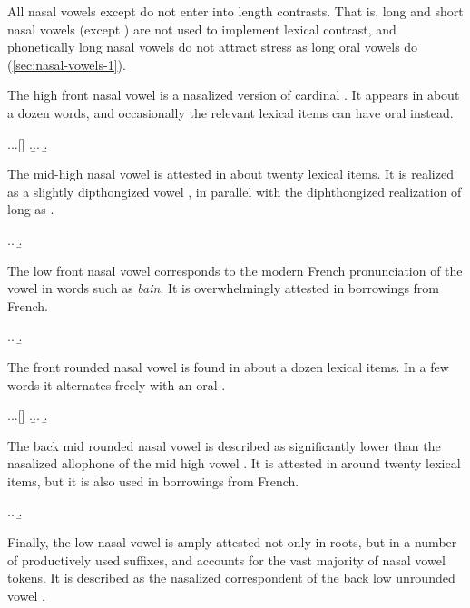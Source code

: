 All nasal vowels except  do not enter into length contrasts. That is, long and short nasal vowels (except ) are not used to implement lexical contrast, and phonetically long nasal vowels do not attract stress as long oral vowels do (\cref{sec:nasal-vowels-1}).

The high front nasal vowel \ipa{[ĩ]} is a nasalized version of cardinal \ipa{[i]}. It appears in about a dozen words, and occasionally the relevant lexical items can have oral \ipa{[i]} instead.

\ex.\a.\a.[]
\z.\b.\a.
\b.\mbi{[ˈhiʒal]}

The mid-high nasal vowel  is attested in about twenty lexical items. It is realized as a slightly dipthongized vowel \ipa{[ẽ\textsuperscript{ĩ}]}, in parallel with the diphthongized realization of long  as \ipa{[e\textsuperscript{i}]}.

\ex.\a.
\b.

The low front nasal vowel \ipa{[æ̃]} corresponds to the modern French pronunciation of the vowel in words such as \emph{bain}. It is overwhelmingly attested in borrowings from French.

\ex.\a.
\b.


The front rounded nasal vowel \ipa{[ø̃]} is found in about a dozen lexical items. In a few words it alternates freely with an oral \ipa{[ø]}.

\ex.\a.\a.[]
\z.\b.\a.
\b.\mbi{[ˈmø̃ːz̥]}

The back mid rounded nasal vowel  is described as significantly lower than the nasalized allophone of the mid high vowel \ipa{[o]}. It is attested in around twenty lexical items, but it is also used in borrowings from French.

\ex.\a.
\b.

Finally, the low nasal vowel  is amply attested not only in roots, but in a number of productively used suffixes, and accounts for the vast majority of nasal vowel tokens. It is described as the nasalized correspondent of the back low unrounded vowel \ipa{[ɑ]}.

